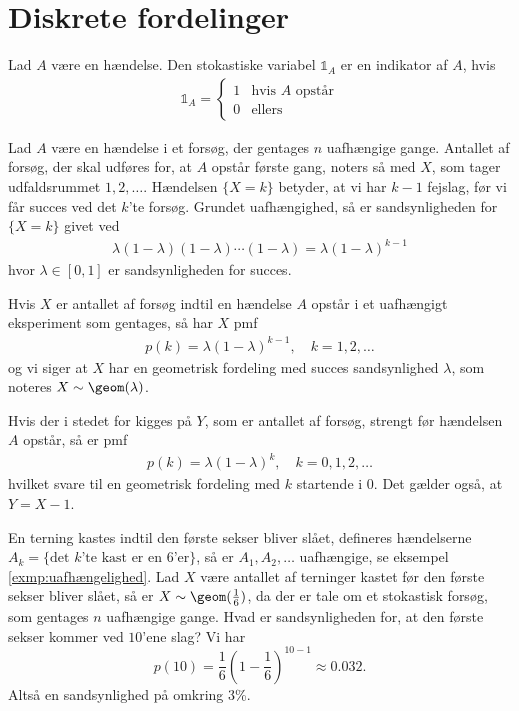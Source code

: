 \section{Diskrete fordelinger}
\begin{defn} [Indikator] %
Lad $A$ være en hændelse. Den stokastiske variabel $\mathbb{1}_A$ er en indikator af $A$, hvis
\begin{align*}
    \mathbb{1}_A=\begin{cases} 
      1 & \text{hvis } A \text{ opstår} \\
      0 & \text{ellers}
   \end{cases}
\end{align*}
\end{defn}

Lad $A$ være en hændelse i et forsøg, der gentages $n$ uafhængige gange. Antallet af forsøg, der skal udføres for, at $A$ opstår første gang, noters så med $X$, som tager udfaldsrummet $1,2,\ldots$. Hændelsen $\{X=k\}$ betyder, at vi har $k-1$ fejslag, før vi får succes ved det $k$'te forsøg. Grundet uafhængighed, så er sandsynligheden for $\{X=k\}$ givet ved
\begin{align*}
    \lambda(1-\lambda)(1-\lambda)\cdots (1-\lambda) =\lambda(1-\lambda)^{k-1}
\end{align*}
hvor $\lambda \in [0, 1]$ er sandsynligheden for succes.
\begin{defn} \label{def:2.14} %
Hvis $X$ er antallet af forsøg indtil en hændelse $A$ opstår i et uafhængigt eksperiment som gentages, så har $X$ pmf 
\begin{align*}
    p(k)=\lambda(1-\lambda)^{k-1}, \quad k=1,2,\ldots 
\end{align*}
og vi siger at $X$ har en geometrisk fordeling med succes sandsynlighed $\lambda$, som noteres $X\sim\geom(\lambda)$.
\end{defn}

Hvis der i stedet for kigges på $Y$, som er antallet af forsøg, strengt før hændelsen $A$ opstår, så er pmf
\begin{align*}
    p(k)=\lambda(1-\lambda)^{k}, \quad k=0,1,2,\ldots 
\end{align*}
hvilket svare til en geometrisk fordeling med $k$ startende i $0$. Det gælder også, at $Y=X-1$.

\begin{exmp}
En terning kastes indtil den første sekser bliver slået, defineres hændelserne $A_k = \{\text{det } k \text{'te kast er en 6'er}\}$, så er $A_1, A_2, \ldots$ uafhængige, se eksempel \ref{exmp:uafhængelighed}. Lad $X$ være antallet af terninger kastet før den første sekser bliver slået, så er $X \sim \geom(\tfrac{1}{6})$, da der er tale om et stokastisk forsøg, som gentages $n$ uafhængige gange. Hvad er sandsynligheden for, at den første sekser kommer ved $10$'ene slag? Vi har 
\begin{equation*}
    p(10) = \frac{1}{6} \left(1-\frac{1}{6}\right)^{10 - 1} \approx 0.032.
\end{equation*}
Altså en sandsynlighed på omkring 3\%.
\end{exmp}


